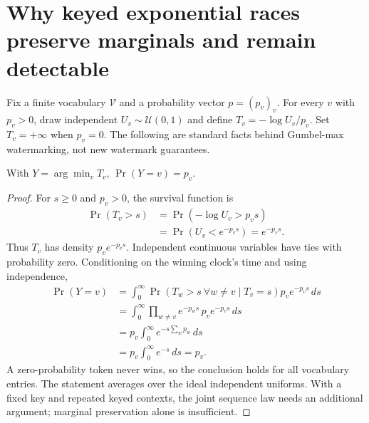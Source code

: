 \section{Why keyed exponential races preserve marginals and remain detectable}
\label{app:race_proofs}
Fix a finite vocabulary $\mathcal V$ and a probability vector $p=(p_v)_v$. For every $v$ with $p_v>0$, draw independent $U_v\sim\mathcal U(0,1)$ and define $T_v=-\log U_v/p_v$. Set $T_v=+\infty$ when $p_v=0$. The following are standard facts behind Gumbel-max watermarking, not new watermark guarantees.

\begin{proposition}
With $Y=\arg\min_vT_v$, $\Pr(Y=v)=p_v$.
\end{proposition}
\begin{proof}
For $s\geq0$ and $p_v>0$, the survival function is
\begin{align}
\Pr(T_v>s)
&=\Pr(-\log U_v>p_vs)\\
&=\Pr(U_v<e^{-p_vs})=e^{-p_vs}.
\end{align}
Thus $T_v$ has density $p_ve^{-p_vs}$. Independent continuous variables have ties with probability zero. Conditioning on the winning clock's time and using independence,
\begin{align}
\Pr(Y=v)
&=\int_0^\infty \Pr(T_w>s\ \forall w\ne v\mid T_v=s)
 p_ve^{-p_vs}\,ds\\
&=\int_0^\infty\prod_{w\ne v}e^{-p_ws}\,p_ve^{-p_vs}\,ds\\
&=p_v\int_0^\infty e^{-s\sum_wp_w}\,ds\\
&=p_v\int_0^\infty e^{-s}\,ds=p_v.
\end{align}
A zero-probability token never wins, so the conclusion holds for all vocabulary entries. The statement averages over the ideal independent uniforms. With a fixed key and repeated keyed contexts, the joint sequence law needs an additional argument; marginal preservation alone is insufficient.
\end{proof}

